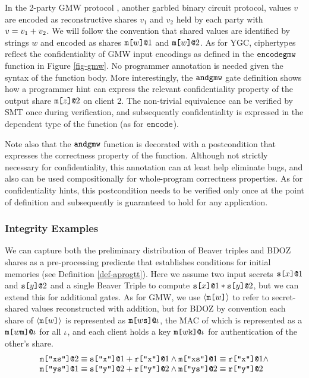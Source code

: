 

In the 2-party GMW protocol \cite{evans2018pragmatic}, another garbled
binary circuit protocol, values $v$ are encoded as reconstructive
shares $v_1$ and $v_2$ held by each party with $v = v_1 + v_2$.
We will follow the convention that shared values are identified by
strings $w$ and encoded as shares $\texttt{m[}w\texttt{]}\texttt{@}1$ and $\texttt{m[}w\texttt{]}\texttt{@}2$.  As for
YGC, ciphertypes reflect the confidentiality of GMW input encodings as
defined in the $\texttt{encodegmw}$ function in Figure \ref{fig-gmw}. No
programmer annotation is needed given the syntax of the function
body. More interestingly, the $\texttt{andgmw}$ gate definition shows how
a programmer hint can express the relevant confidentiality property of
the output share $\texttt{m[}z\texttt{]}\texttt{@}2$ on client 2. The non-trivial equivalence
can be verified by SMT once during verification, and subsequently
confidentiality is expressed in the dependent type of the function
(as for $\texttt{encode}$).

Note also that the $\texttt{andgmw}$ function is decorated with a
postcondition that expresses the correctness property of the
function. Although not strictly necessary for confidentiality, this
annotation can at least help eliminate bugs, and also can be used
compositionally for whole-program correctness properties. As for
confidentiality hints, this postcondition needs to be verified only
once at the point of definition and subsequently is guaranteed to hold
for any application.

\subsubsection{Integrity Examples}



We can capture both the preliminary distribution of Beaver triples and
BDOZ shares as a pre-processing predicate that establishes conditions
for initial memories (see Definition \ref{def-aprogtt}).  Here we
assume two input secrets $\texttt{s[}x\texttt{]}\texttt{@}1$ and
$\texttt{s[}y\texttt{]}\texttt{@}2$ and a single Beaver Triple to compute
$\texttt{s[}x\texttt{]}\texttt{@}1 * \texttt{s[}y\texttt{]}\texttt{@}2$, but we can extend
this for additional gates.  As for GMW, we use
$\langle \texttt{m[}w\texttt{]} \rangle$ to refer to
secret-shared values reconstructed with addition, but for BDOZ by
convention each share of $\langle \texttt{m[}w\texttt{]} \rangle$ is represented as
$\texttt{m[}w\texttt{s}\texttt{]}\texttt{@}\iota$, the MAC of which is represented as a
$\texttt{m[}w\texttt{m}\texttt{]}\texttt{@}\iota$ for all $\iota$, and each client holds a
key $\texttt{m[}w\texttt{k}\texttt{]}\texttt{@}\iota$ for authentication of the other's
share.
$$
\begin{array}{l}
\texttt{m[}\texttt{"xs"}\texttt{]}\texttt{@}2 \equiv \texttt{s[}\texttt{"x"}\texttt{]}\texttt{@}1 + \texttt{r[}\texttt{"x"}\texttt{]}\texttt{@}1 \wedge 
\texttt{m[}\texttt{"xs"}\texttt{]}\texttt{@}1 \equiv \texttt{r[}\texttt{"x"}\texttt{]}\texttt{@}1 \wedge \\
\texttt{m[}\texttt{"ys"}\texttt{]}\texttt{@}1 \equiv \texttt{s[}\texttt{"y"}\texttt{]}\texttt{@}2 + \texttt{r[}\texttt{"y"}\texttt{]}\texttt{@}2 \wedge 
\texttt{m[}\texttt{"ys"}\texttt{]}\texttt{@}2 \equiv \texttt{r[}\texttt{"y"}\texttt{]}\texttt{@}2 
\end{array}
$$

